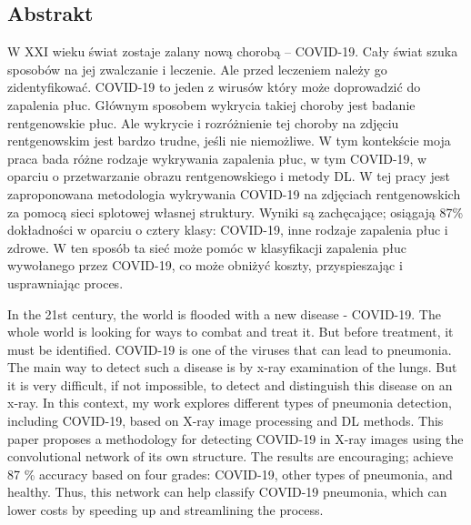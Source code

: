 \documentclass{article}
\begin{document}
\subsection{Abstrakt}
W XXI wieku świat zostaje zalany nową chorobą – COVID-19. Cały świat szuka sposobów na jej zwalczanie i leczenie. Ale przed leczeniem należy go zidentyfikować. COVID-19 to jeden z wirusów który może doprowadzić do zapalenia płuc. Głównym sposobem wykrycia takiej choroby jest badanie rentgenowskie płuc. Ale wykrycie i rozróżnienie tej choroby na zdjęciu rentgenowskim jest bardzo trudne, jeśli nie niemożliwe. W tym kontekście moja praca bada różne rodzaje wykrywania zapalenia płuc, w tym COVID-19, w oparciu o przetwarzanie obrazu rentgenowskiego i metody DL. W tej pracy jest zaproponowana metodologia wykrywania COVID-19 na zdjęciach rentgenowskich za pomocą sieci splotowej własnej struktury. Wyniki są zachęcające; osiągają 87\% dokładności w oparciu o cztery klasy: COVID-19, inne rodzaje zapalenia płuc i zdrowe. W ten sposób ta sieć może pomóc w klasyfikacji zapalenia płuc wywołanego przez COVID-19, co może obniżyć koszty, przyspieszając i usprawniając proces.\\

\vspace{0.4cm}

In the 21st century, the world is flooded with a new disease - COVID-19. The whole world is looking for ways to combat and treat it. But before treatment, it must be identified. COVID-19 is one of the viruses that can lead to pneumonia. The main way to detect such a disease is by x-ray examination of the lungs. But it is very difficult, if not impossible, to detect and distinguish this disease on an x-ray. In this context, my work explores different types of pneumonia detection, including COVID-19, based on X-ray image processing and DL methods. This paper proposes a methodology for detecting COVID-19 in X-ray images using the convolutional network of its own structure. The results are encouraging; achieve 87 \% accuracy based on four grades: COVID-19, other types of pneumonia, and healthy. Thus, this network can help classify COVID-19 pneumonia, which can lower costs by speeding up and streamlining the process.


\end{document}
